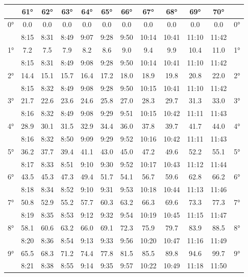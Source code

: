 \begin{footnotesize}\begin{tabular}{c || c | c | c | c | c | c | c | c | c | c || c}
		\space &61°&62°&63°&64°&65°&66°&67°&68°&69°&70°\\\hline\hline
		\multirow{2}{*}{0°}&0.0&0.0&0.0&0.0&0.0&0.0&0.0&0.0&0.0&0.0&\multirow{2}{*}{0°}\\ \space&8:15&8:31&8:49&9:07&9:28&9:50&10:14&10:41&11:10&11:42&\space\\\hline
		\multirow{2}{*}{1°}&7.2&7.5&7.9&8.2&8.6&9.0&9.4&9.9&10.4&11.0&\multirow{2}{*}{1°}\\ \space&8:15&8:31&8:49&9:08&9:28&9:50&10:14&10:41&11:10&11:42&\space\\\hline
		\multirow{2}{*}{2°}&14.4&15.1&15.7&16.4&17.2&18.0&18.9&19.8&20.8&22.0&\multirow{2}{*}{2°}\\ \space&8:15&8:32&8:49&9:08&9:28&9:50&10:15&10:41&11:10&11:42&\space\\\hline
		\multirow{2}{*}{3°}&21.7&22.6&23.6&24.6&25.8&27.0&28.3&29.7&31.3&33.0&\multirow{2}{*}{3°}\\ \space&8:16&8:32&8:49&9:08&9:29&9:51&10:15&10:42&11:11&11:43&\space\\\hline
		\multirow{2}{*}{4°}&28.9&30.1&31.5&32.9&34.4&36.0&37.8&39.7&41.7&44.0&\multirow{2}{*}{4°}\\ \space&8:16&8:32&8:50&9:09&9:29&9:52&10:16&10:42&11:11&11:43&\space\\\hline
		\multirow{2}{*}{5°}&36.2&37.7&39.4&41.1&43.0&45.0&47.2&49.6&52.2&55.1&\multirow{2}{*}{5°}\\ \space&8:17&8:33&8:51&9:10&9:30&9:52&10:17&10:43&11:12&11:44&\space\\\hline
		\multirow{2}{*}{6°}&43.5&45.3&47.3&49.4&51.7&54.1&56.7&59.6&62.8&66.2&\multirow{2}{*}{6°}\\ \space&8:18&8:34&8:52&9:10&9:31&9:53&10:18&10:44&11:13&11:46&\space\\\hline
		\multirow{2}{*}{7°}&50.8&52.9&55.2&57.7&60.3&63.2&66.3&69.6&73.3&77.3&\multirow{2}{*}{7°}\\ \space&8:19&8:35&8:53&9:12&9:32&9:54&10:19&10:45&11:15&11:47&\space\\\hline
		\multirow{2}{*}{8°}&58.1&60.6&63.2&66.0&69.1&72.3&75.9&79.7&83.9&88.5&\multirow{2}{*}{8°}\\ \space&8:20&8:36&8:54&9:13&9:33&9:56&10:20&10:47&11:16&11:49&\space\\\hline
		\multirow{2}{*}{9°}&65.5&68.3&71.2&74.4&77.8&81.5&85.5&89.8&94.6&99.7&\multirow{2}{*}{9°}\\ \space&8:21&8:38&8:55&9:14&9:35&9:57&10:22&10:49&11:18&11:50&\space\\\hline

\end{tabular}
\end{footnotesize}
